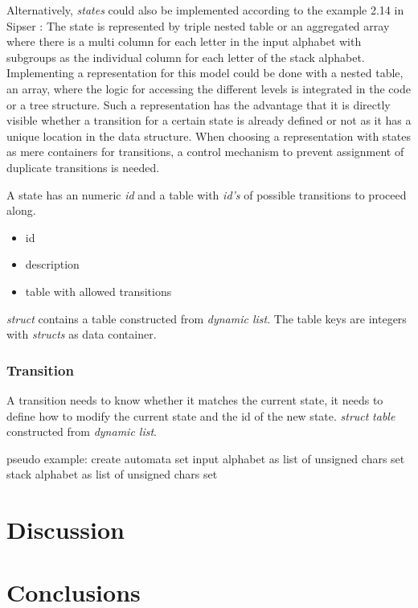 \documentclass[a4paper,11pt,twoside]{article}
\begin{document}
Alternatively, \textit{states} could also be implemented according to
the example 2.14 in Sipser \cite[p. 114]{sipser2012}: The state is
represented by triple nested table or
an aggregated array where there is a multi column for each letter in
the input alphabet with subgroups as the individual column for each
letter of the stack alphabet. Implementing a representation for this
model could be done with a nested table, an array, where the logic for
accessing the different levels is integrated in the code or a tree
structure. Such a representation has the advantage that it is directly
visible whether a transition for a certain state is already defined or
not as it has a unique location in the data structure. When choosing a
representation with states as mere containers for transitions, a
control mechanism to prevent assignment of duplicate transitions is
needed. 




A state has an numeric \textit{id} and a table with \textit{id's} of possible
transitions to proceed along. 

\begin{itemize}
\item id
\item description
\item table with allowed transitions
\end{itemize}

\textit{struct} contains a table constructed from \textit{dynamic
  list}. The table keys are integers with \textit{structs} as data
container. 


\subsubsection{Transition}
A transition needs to know whether it matches the current
state, it needs to define how to modify the current state and the id
of the new state. 
\textit{struct} 
\textit{table} constructed from \textit{dynamic list}. 

pseudo example:
create automata
set input alphabet as list of unsigned chars
set stack alphabet as list of unsigned chars
set 

\section{Discussion}

\section{Conclusions}


\end{document}
